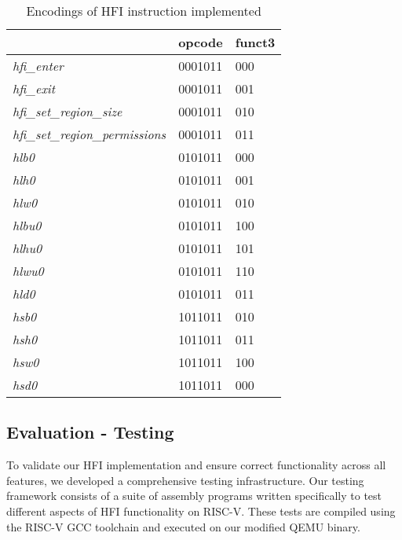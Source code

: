 \documentclass[conference,compsoc]{IEEEtran}
\begin{document}
\begin{table}[]
\caption{Encodings of HFI instruction implemented}
\label{tab:hfi_instructions}
\begin{tabular}{|l|l|l|}
\hline
                                         &  opcode   & funct3   \\ \hline
\textit{hfi\_enter}                      &  0001011  &  000     \\ \hline
\textit{hfi\_exit}                       &  0001011  &  001     \\ \hline
\textit{hfi\_set\_region\_size}          &  0001011  &  010     \\ \hline
\textit{hfi\_set\_region\_permissions}   &  0001011  &  011     \\ \hline
\textit{hlb0}                       &  0101011  &  000     \\ \hline
\textit{hlh0}                       &  0101011  &  001     \\ \hline
\textit{hlw0}                       &  0101011  &  010     \\ \hline
\textit{hlbu0}                      &  0101011  &  100     \\ \hline
\textit{hlhu0}                      &  0101011  &  101     \\ \hline
\textit{hlwu0}                      &  0101011  &  110     \\ \hline
\textit{hld0}                       &  0101011  &  011     \\ \hline
\textit{hsb0}                       &  1011011  &  010     \\ \hline
\textit{hsh0}                       &  1011011  &  011     \\ \hline
\textit{hsw0}                       &  1011011  &  100     \\ \hline
\textit{hsd0}                       &  1011011  &  000     \\ \hline
\end{tabular}
\end{table}

\subsection{Evaluation - Testing}
To validate our HFI implementation and ensure correct functionality across all features, we developed a comprehensive testing infrastructure. Our testing framework consists of a suite of assembly programs written specifically to test different aspects of HFI functionality on RISC-V. These tests are compiled using the RISC-V GCC toolchain and executed on our modified QEMU binary.
\end{document}
